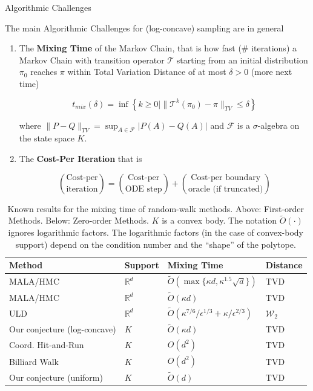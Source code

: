\documentclass[10pt]{beamer}
\begin{document}
\begin{frame}[allowframebreaks]{Algorithmic Challenges}

The main Algorithmic Challenges for (log-concave) sampling are in general

\begin{enumerate}
    \item The \textbf{Mixing Time} of the Markov Chain, that is how fast (\# iterations) a Markov Chain with transition operator $\mathcal T$ starting from an initial distribution $\pi_0$ reaches $\pi$ within Total Variation Distance of at most $\delta > 0$ (more next time)
    
    $$t_{mix}(\delta) = \inf \left \{ k \ge 0 | \| \mathcal T^k (\pi_0) - \pi \|_{TV} \le \delta \right \}$$
    
    where $\| P - Q \|_{TV} = \sup_{A \in \mathcal F} |P(A) - Q(A)|$ and $\mathcal F$ is a $\sigma$-algebra on the state space $K$. 
    
    \item The \textbf{Cost-Per Iteration} that is 
    
    $$\binom {\text {Cost-per}} {\text{iteration}} = \binom {\text {Cost-per}} {\text{ODE step}} + \binom {\text {Cost-per boundary}} {\text{oracle (if truncated)}}$$

    \end{enumerate}


    \framebreak
    
        
    \begin{table}
        \centering
        \begin{tabu} to \textwidth {X[3] X X[3] X}
        \toprule
            Method & Support & Mixing Time & Distance \\
        \midrule
            MALA/HMC \cite{dwivedi2019log} & $\mathbb R^d$ &  $\tilde O(\max \{ \kappa d, \kappa^{1.5} \sqrt d \})$ & TVD \\
            MALA/HMC \cite{lee2020logsmooth} & $\mathbb R^d$ & $\tilde O(\kappa d)$ & TVD \\
            ULD \cite{shen2019randomized} & $\mathbb R^d$ & $\tilde O(\kappa^{7/6} / \epsilon^{1/3} + \kappa / \epsilon^{2/3}) $ & $\mathcal W_2$ \\
            Our conjecture (log-concave) & $K$  & $\tilde O(\kappa d)$ & TVD \\
            \midrule 
            Coord. Hit-and-Run \cite{haraldsdottir2017chrr} &  $K$ & $O(d^2)$ & TVD \\
            Billiard Walk \cite{gryazina2014random} & $K$ & $O(d^2)$ & TVD  \\
            Our conjecture (uniform) & $K$ & $\tilde O(d)$ & TVD \\
        \bottomrule
        \end{tabu}
        \caption{Known results for the mixing time of random-walk methods. Above: First-order Methods. Below: Zero-order Methods. $K$ is a convex body. The notation $\tilde O(\cdot)$ ignores logarithmic factors. The logarithmic factors (in the case of convex-body support) depend on the condition number and the ``shape'' of the polytope.}
        \label{table:methods}
    \end{table}


\end{frame}
\end{document}
